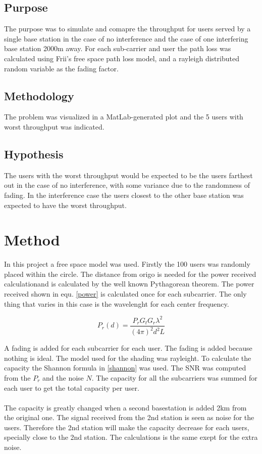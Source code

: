 \documentclass[twocolumn]{article}
\begin{document}
\subsection{Purpose}
The purpose was to simulate and comapre the throughput for users served by a single base station in the case of no interference and the case of one interfering base station 2000m away. For each sub-carrier and user the path loss was calculated using Frii's free space path loss model, and a rayleigh distributed random variable as the fading factor.


\subsection{Methodology}
The problem was visualized in a MatLab-generated plot and the 5 users with worst throughput was indicated.

\subsection{Hypothesis}
The users with the worst throughput would be expected to be the users farthest out in the case of no interference, with some variance due to the randomness of fading. In the interference case the users closest to the other base station was expected to have the worst throughput.
\section{Method}
In this project a free space model was used.
Firstly the 100 users was randomly placed within the circle. The distance from origo is needed for the power received calculationand is calculated by the well known Pythagorean theorem. The power received shown in equ. \eqref{power}  is calculated once for each subcarrier. The only thing that varies in this case is the wavelenght for each center frequency.

\begin{equation}
\label{power}
P_r(d)=\frac{P_rG_tG_r\lambda^2}{(4\pi)^2d^2L}
\end{equation}

A fading is added for each subcarrier for each user. The fading is added because nothing is ideal. The model used for the shading was rayleight.
To calculate the capacity the Shannon formula in \eqref{shannon} was used. The SNR was computed from the $P_r$ and the noise $N$.
The capacity for all the subcarriers was summed for each user to get the total capacity per user.
\\
\\
The capacity is greatly changed when a second basestation is added 2km from the original one.
The signal received from the 2nd station is seen as noise for the users.
Therefore the 2nd station will make the capacity decrease for each users, specially close to the 2nd station.
The calculations is the same exept for the extra noise.
\end{document}

